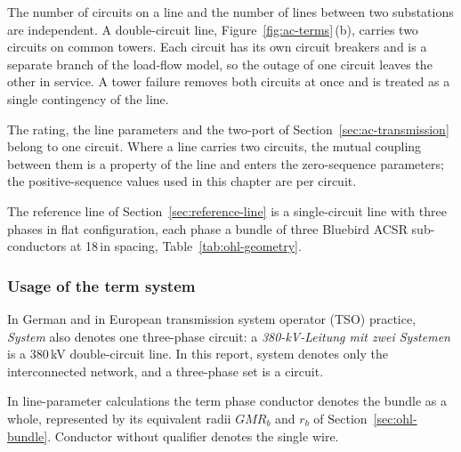 The number of circuits on a line and the number of lines between two
substations are independent. A double-circuit line, Figure~\ref{fig:ac-terms}\,(b),
carries two circuits on common towers. Each circuit has its own circuit
breakers and is a separate branch of the load-flow model, so the outage of
one circuit leaves the other in service. A tower failure removes both
circuits at once and is treated as a single contingency of the line.

The rating, the line parameters and the two-port of
Section~\ref{sec:ac-transmission} belong to one circuit. Where a line
carries two circuits, the mutual coupling between them is a property of the
line and enters the zero-sequence parameters; the positive-sequence values
used in this chapter are per circuit.

The reference line of Section~\ref{sec:reference-line} is a single-circuit
line with three phases in flat configuration, each phase a bundle of three
Bluebird ACSR sub-conductors at 18\,in spacing, Table~\ref{tab:ohl-geometry}.

\subsubsection{Usage of the term system}
\label{sec:ac-terms-system}

In German and in European transmission system operator (TSO) practice,
\emph{System} also denotes one three-phase circuit: a
\emph{380-kV-Leitung mit zwei Systemen} is a 380\,kV double-circuit line.
In this report, system denotes only the interconnected network, and a
three-phase set is a circuit.

In line-parameter calculations the term phase conductor denotes the bundle
as a whole, represented by its equivalent radii $GMR_b$ and $r_b$ of
Section~\ref{sec:ohl-bundle}. Conductor without qualifier denotes the single
wire.

\FloatBarrier
